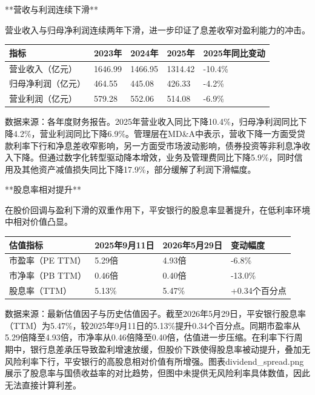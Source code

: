 \documentclass[12pt,a4paper]{article}
\begin{document}
**营收与利润连续下滑**

营业收入与归母净利润连续两年下滑，进一步印证了息差收窄对盈利能力的冲击。

\begin{table}[htbp]
\centering
\begin{tabular}{lllll}
\toprule
指标 & 2023年 & 2024年 & 2025年 & 2025年同比变动 \\
\midrule
营业收入（亿元） & 1646.99 & 1466.95 & 1314.42 & -10.4\% \\
归母净利润（亿元） & 464.55 & 445.08 & 426.33 & -4.2\% \\
营业利润（亿元） & 579.28 & 552.06 & 514.08 & -6.9\% \\
\bottomrule
\end{tabular}
\end{table}


数据来源：各年度财务报告。2025年营业收入同比下降10.4\%，归母净利润同比下降4.2\%，营业利润同比下降6.9\%。管理层在MD\&A中表示，营收下降一方面受贷款利率下行和净息差收窄影响，另一方面受市场波动影响，债券投资等非利息净收入下降。但通过数字化转型驱动降本增效，业务及管理费同比下降5.9\%，同时信用及其他资产减值损失同比下降17.9\%，部分缓解了利润下滑幅度。

**股息率相对提升**

在股价回调与盈利下滑的双重作用下，平安银行的股息率显著提升，在低利率环境中相对价值凸显。

\begin{table}[htbp]
\centering
\begin{tabular}{llll}
\toprule
估值指标 & 2025年9月11日 & 2026年5月29日 & 变动幅度 \\
\midrule
市盈率（PE TTM） & 5.29倍 & 4.93倍 & -6.8\% \\
市净率（PB TTM） & 0.46倍 & 0.40倍 & -13.0\% \\
股息率（TTM） & 5.13\% & 5.47\% & +0.34个百分点 \\
\bottomrule
\end{tabular}
\end{table}


数据来源：最新估值因子与历史估值因子。截至2026年5月29日，平安银行股息率（TTM）为5.47\%，较2025年9月11日的5.13\%提升0.34个百分点。同期市盈率从5.29倍降至4.93倍，市净率从0.46倍降至0.40倍，估值进一步压缩。在利率下行周期中，银行息差承压导致盈利增速放缓，但股价下跌使得股息率被动提升，叠加无风险利率下行，平安银行的高股息相对价值有所增强。图表dividend\_spread.png展示了股息率与国债收益率的对比趋势，但图中未提供无风险利率具体数值，因此无法直接计算利差。
\end{document}
